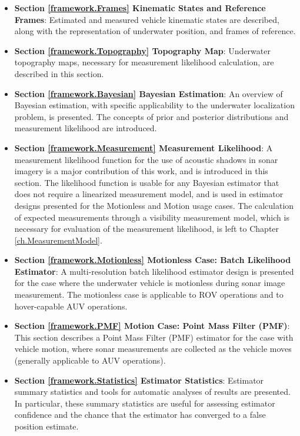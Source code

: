 \begin{itemize}

\item \textbf{Section \ref{framework.Frames} Kinematic States and Reference Frames}:  Estimated and measured vehicle kinematic states are described, along with the representation of underwater position, and frames of reference. 

\item \textbf{Section \ref{framework.Topography} Topography Map}: Underwater topography maps, necessary for measurement likelihood calculation, are described in this section.

\item \textbf{Section \ref{framework.Bayesian} Bayesian Estimation}: An overview of Bayesian estimation, with specific applicability to the underwater localization problem, is presented. 
The concepts of prior and posterior distributions and measurement likelihood are introduced.

\item \textbf{Section \ref{framework.Measurement} Measurement Likelihood}: A measurement likelihood function for the use of acoustic shadows in sonar imagery is a major contribution of this work, and is introduced in this section.
The likelihood function is usable for any Bayesian estimator that does not require a linearized measurement model, and is used in estimator designs presented for the Motionless and Motion usage cases.
The calculation of expected measurements through a visibility measurement model, which is necessary for evaluation of the measurement likelihood, is left to Chapter \ref{ch.MeasurementModel}.

\item \textbf{Section \ref{framework.Motionless} Motionless Case: Batch Likelihood Estimator}: A multi-resolution batch likelihood estimator design is presented for the case where the underwater vehicle is motionless during sonar image measurement.  
The motionless case is applicable to ROV operations and to hover-capable AUV operations.

\item \textbf{Section \ref{framework.PMF} Motion Case: Point Mass Filter (PMF)}: This section describes a Point Mass Filter (PMF) estimator for the case with vehicle motion, where sonar measurements are collected as the vehicle moves (generally applicable to AUV operations).

\item \textbf{Section \ref{framework.Statistics} Estimator Statistics}: Estimator summary statistics and tools for automatic analyses of results are presented.  
In particular, these summary statistics are useful for assessing estimator confidence and the chance that the estimator has converged to a false position estimate.

\end{itemize}

